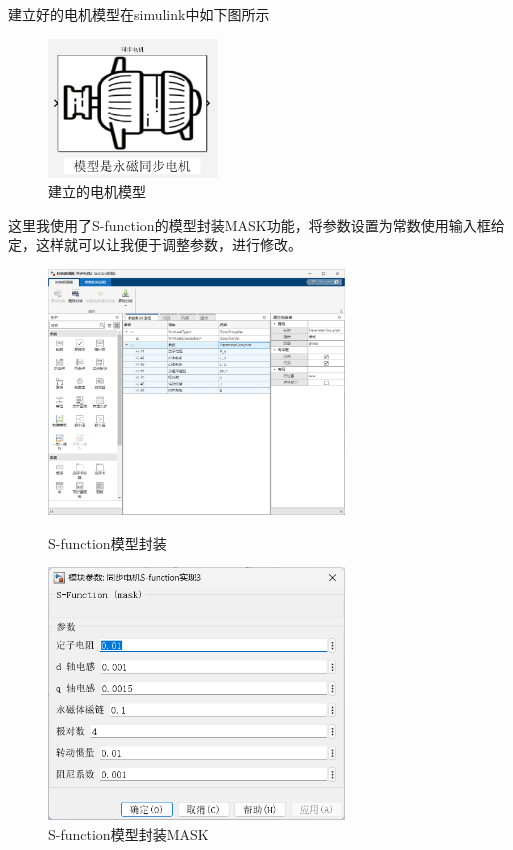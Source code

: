 \documentclass[12pt,a4paper,UTF8]{article}
\begin{document}
建立好的电机模型在simulink中如下图所示


\begin{figure}[htbp] \centering \includegraphics[width=0.4\textwidth]{2024-12-30-11-32-16.png} \caption{建立的电机模型}\end{figure}

这里我使用了S-function的模型封装MASK功能，将参数设置为常数使用输入框给定，这样就可以让我便于调整参数，进行修改。


\begin{figure}[!htbp]
    \centering
    \begin{minipage}[b]{0.45\linewidth}
        \centering
        \includegraphics[width=0.7\textwidth]{2024-12-30-11-45-42.png} \caption{S-function模型封装}
         
    \end{minipage}%
    \begin{minipage}[b]{0.45\linewidth}
        \centering
        \includegraphics[width=0.7\textwidth]{2024-12-30-11-45-08.png} \caption{S-function模型封装MASK}
    \end{minipage}
\end{figure}
\end{document}
